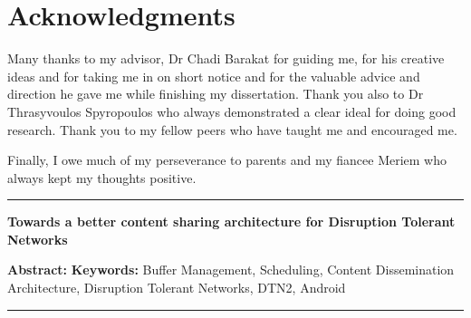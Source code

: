 \documentclass[a4paper,11pt,twoside]{ThesisStyle}
\begin{document}


\dominitoc


 \cleardoublepage

\section*{Acknowledgments}

Many thanks to my advisor, Dr Chadi Barakat for guiding me, for his creative ideas and for taking me in on short notice and for the valuable advice and direction he gave me while finishing my dissertation. Thank you also to Dr Thrasyvoulos Spyropoulos who always demonstrated a clear ideal for doing good research.
Thank you to my fellow peers who have taught me and encouraged me.

Finally, I owe much of my perseverance to parents and my fiancee Meriem who always kept my thoughts positive.

\tableofcontents

\mainmatter









\appendix



%




\cleardoublepage
\begin{vcenterpage}
\noindent\rule[2pt]{\textwidth}{0.5pt}
\begin{center}
{\large\textbf{Towards a better content sharing architecture for Disruption Tolerant Networks
\\}}
\end{center}
{\large\textbf{Abstract:}}
{\large\textbf{Keywords:}}
Buffer Management, Scheduling, Content Dissemination Architecture, Disruption Tolerant Networks, DTN2, Android  
\\
\noindent\rule[2pt]{\textwidth}{0.5pt}
\end{vcenterpage}
\end{document}
